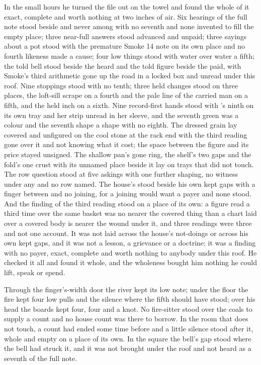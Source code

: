 In the small hours he turned the file out on the towel and found the whole of it exact, complete and worth nothing at two inches of air. Six hearings of the full note stood beside and never among with no seventh and none invented to fill the empty place; three near-full answers stood advanced and unpaid; three sayings about a pot stood with the premature Smoke 14 note on its own place and no fourth likeness made a cause; four low things stood with water over water a fifth; the told bell stood beside the heard and the told figure beside the paid, with Smoke's third arithmetic gone up the road in a locked box and unread under this roof. Nine stoppings stood with no tenth; three held changes stood on three places, the loft-sill scrape on a fourth and the pale line of the carried man on a fifth, and the held inch on a sixth. Nine record-first hands stood with 's ninth on its own tray and her strip unread in her sleeve, and the seventh green was a colour and the seventh shape a shape with no eighth. The dressed grain lay covered and unfigured on the cool stone at the rack end with the third reading gone over it and not knowing what it cost; the space between the figure and its price stayed unsigned. The shallow pan's gone ring, the shelf's two gaps and the fold's one crust with its unnamed place beside it lay on trays that did not touch. The row question stood at five askings with one further shaping, no witness under any and no row named. The house's  stood beside his own kept gaps with a finger between and no joining, for a joining would want a payer and none stood. And the finding of the third reading stood on a place of its own: a figure read a third time over the same basket was no nearer the covered thing than a chart laid over a covered body is nearer the wound under it, and three readings were three and not one account. It was not laid across the house's not-doings or across his own kept gaps, and it was not a lesson, a grievance or a doctrine; it was a finding with no payer, exact, complete and worth nothing to anybody under this roof. He checked it all and found it whole, and the wholeness bought him nothing he could lift, speak or spend.

Through the finger's-width door the river kept its low note; under the floor the fire kept four low pulls and the silence where the fifth should have stood; over his head the boards kept four, four and a knot. No fire-sitter stood over the coals to supply a count and no house count was there to borrow. In the room that does not touch, a count had ended some time before and a little silence stood after it, whole and empty on a place of its own. In the square the bell's gap stood where the bell had struck it, and it was not brought under the roof and not heard as a seventh of the full note.

